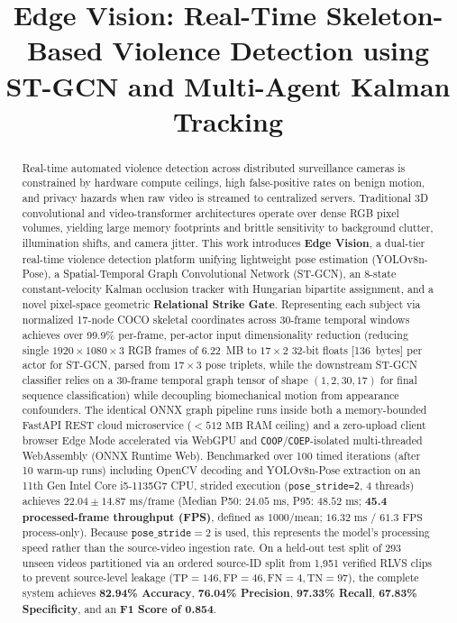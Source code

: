 \documentclass[conference]{IEEEtran}
\begin{document}
\title{Edge Vision: Real-Time Skeleton-Based Violence Detection using ST-GCN and Multi-Agent Kalman Tracking}

\author{
}

\maketitle

\begin{abstract}
Real-time automated violence detection across distributed surveillance cameras is constrained by hardware compute ceilings, high false-positive rates on benign motion, and privacy hazards when raw video is streamed to centralized servers. Traditional 3D convolutional and video-transformer architectures operate over dense RGB pixel volumes, yielding large memory footprints and brittle sensitivity to background clutter, illumination shifts, and camera jitter. This work introduces \textbf{Edge Vision}, a dual-tier real-time violence detection platform unifying lightweight pose estimation (\mbox{YOLOv8n-Pose}), a Spatial-Temporal Graph Convolutional Network (\mbox{ST-GCN}), an 8-state constant-velocity Kalman occlusion tracker with Hungarian bipartite assignment, and a novel pixel-space geometric \textbf{Relational Strike Gate}. Representing each subject via normalized 17-node COCO skeletal coordinates across 30-frame temporal windows achieves over 99.9\% per-frame, per-actor input dimensionality reduction (reducing single $1920 \times 1080 \times 3$ RGB frames of 6.22~MB to $17 \times 2$ 32-bit floats [136~bytes] per actor for ST-GCN, parsed from $17 \times 3$ pose triplets, while the downstream ST-GCN classifier relies on a 30-frame temporal graph tensor of shape $(1, 2, 30, 17)$ for final sequence classification) while decoupling biomechanical motion from appearance confounders. The identical ONNX graph pipeline runs inside both a memory-bounded FastAPI REST cloud microservice ($<512\text{ MB}$ RAM ceiling) and a zero-upload client browser Edge Mode accelerated via WebGPU and \texttt{COOP}/\texttt{COEP}-isolated multi-threaded WebAssembly (ONNX Runtime Web). Benchmarked over 100 timed iterations (after 10 warm-up runs) including OpenCV decoding and YOLOv8n-Pose extraction on an 11th Gen Intel Core i5-1135G7 CPU, strided execution (\texttt{pose\_stride=2}, 4 threads) achieves $22.04 \pm 14.87\text{ ms/frame}$ (Median P50: $24.05\text{ ms}$, P95: $48.52\text{ ms}$; \textbf{45.4 processed-frame throughput (FPS)}, defined as $1000/\text{mean}$; $16.32\text{ ms}$ / $61.3\text{ FPS}$ process-only). Because $\texttt{pose\_stride}=2$ is used, this represents the model's processing speed rather than the source-video ingestion rate. On a held-out test split of 293 unseen videos partitioned via an ordered source-ID split from 1,951 verified RLVS clips to prevent source-level leakage ($\text{TP}=146, \text{FP}=46, \text{FN}=4, \text{TN}=97$), the complete system achieves \textbf{82.94\% Accuracy}, \textbf{76.04\% Precision}, \textbf{97.33\% Recall}, \textbf{67.83\% Specificity}, and an \textbf{F1 Score of 0.854}.

\end{abstract}
\end{document}
